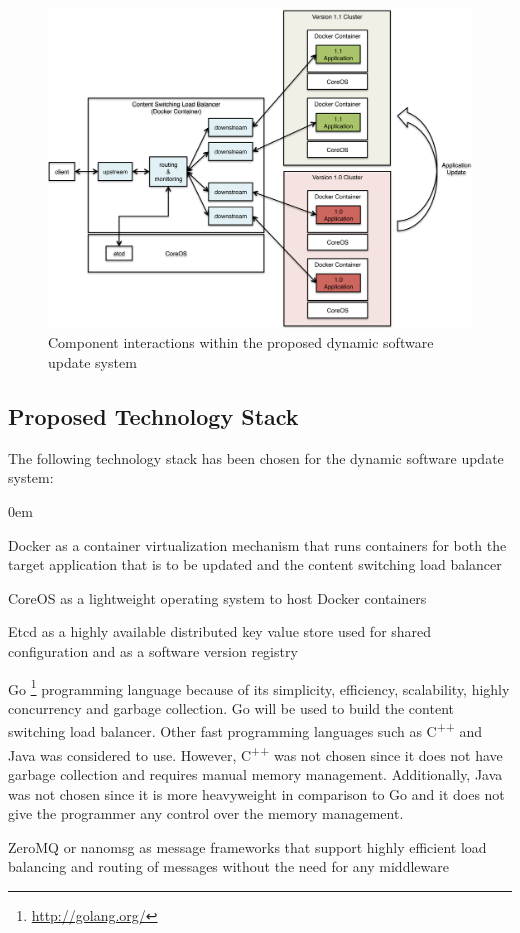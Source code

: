 \documentclass[a4paper,11pt,twoside]{article}
\begin{document}
\begin{figure}[!ht]
  \centering
     \includegraphics[scale=0.62]{proposed_solution}
  \caption{Component interactions within the proposed  dynamic software update system}
  \label{proposed_solution}
\end{figure}


\subsection{Proposed Technology Stack} 
The following technology stack has been chosen for the dynamic software update system:

\begin{list}{-}{}
  \itemsep0em
  \item Docker as a container virtualization mechanism that runs containers for both the target application that is to be updated and the content switching load balancer
  \item CoreOS as a lightweight operating system to host Docker containers
  
  \item Etcd as a highly available distributed key value store used for shared configuration and as a software version registry
  
  \item Go \footnote{\url{http://golang.org/}} programming language because of its simplicity, efficiency, scalability, highly concurrency and garbage collection. Go will be used to build the content switching load balancer. Other fast programming languages such as C\textsuperscript{++} and Java was considered to use. However, C\textsuperscript{++} was not chosen since it does not have garbage collection and requires manual memory management.  Additionally, Java was not chosen since it is more heavyweight in comparison to Go and it does not give the programmer any control over the memory management.    
  
  \item ZeroMQ or nanomsg as message frameworks that support highly efficient load balancing and routing of messages without the need for any middleware  

    \end{list}
\end{document}
